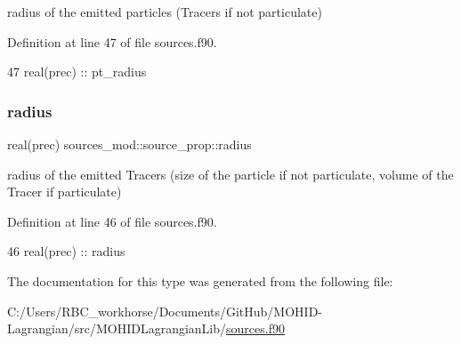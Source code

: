 radius of the emitted particles (Tracers if not particulate) 



Definition at line 47 of file sources.\+f90.


\begin{DoxyCode}
47         \textcolor{keywordtype}{real(prec)} :: pt\_radius
\end{DoxyCode}
\mbox{\label{structsources__mod_1_1source__prop_af4cc47a1f8a8d28088150eba368d80a5}} 
\subsubsection{\texorpdfstring{radius}{radius}}
{\footnotesize\ttfamily real(prec) sources\+\_\+mod\+::source\+\_\+prop\+::radius\hspace{0.3cm}{\ttfamily [private]}}



radius of the emitted Tracers (size of the particle if not particulate, volume of the Tracer if particulate) 



Definition at line 46 of file sources.\+f90.


\begin{DoxyCode}
46         \textcolor{keywordtype}{real(prec)} :: radius
\end{DoxyCode}


The documentation for this type was generated from the following file\+:\begin{DoxyCompactItemize}
\item 
C\+:/\+Users/\+R\+B\+C\+\_\+workhorse/\+Documents/\+Git\+Hub/\+M\+O\+H\+I\+D-\/\+Lagrangian/src/\+M\+O\+H\+I\+D\+Lagrangian\+Lib/\mbox{\hyperlink{sources_8f90}{sources.\+f90}}\end{DoxyCompactItemize}
